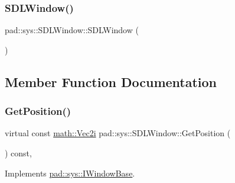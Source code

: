 \mbox{\label{classpad_1_1sys_1_1_s_d_l_window_a2c16cacdc5ab08b8d84e00f287cab5ad}} 
\subsubsection{\texorpdfstring{S\+D\+L\+Window()}{SDLWindow()}\hspace{0.1cm}{\footnotesize\ttfamily [3/3]}}
{\footnotesize\ttfamily pad\+::sys\+::\+S\+D\+L\+Window\+::\+S\+D\+L\+Window (\begin{DoxyParamCaption}\item[{\mbox{\hyperlink{classpad_1_1sys_1_1_s_d_l_window}{S\+D\+L\+Window}} \&\&}]{ }\end{DoxyParamCaption})\hspace{0.3cm}{\ttfamily [delete]}}



\subsection{Member Function Documentation}
\mbox{\label{classpad_1_1sys_1_1_s_d_l_window_a43391052519ec0bc8c194642d6d68d12}} 
\subsubsection{\texorpdfstring{Get\+Position()}{GetPosition()}}
{\footnotesize\ttfamily virtual const \mbox{\hyperlink{namespacepad_1_1math_a808a631a6bccd994f9589d7fb86bad41}{math\+::\+Vec2i}} pad\+::sys\+::\+S\+D\+L\+Window\+::\+Get\+Position (\begin{DoxyParamCaption}{ }\end{DoxyParamCaption}) const\hspace{0.3cm}{\ttfamily [inline]}, {\ttfamily [virtual]}}



Implements \mbox{\hyperlink{classpad_1_1sys_1_1_i_window_base_ac3cb42c492b8c2ba59f36da4702b7bec}{pad\+::sys\+::\+I\+Window\+Base}}.

